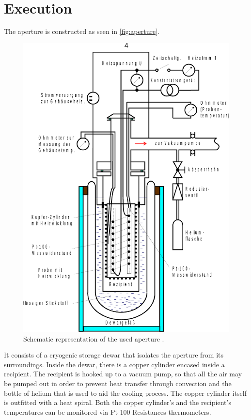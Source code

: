 \section{Execution}
\label{sec:Durchführung}

The aperture is constructed as seen in \autoref{fig:aperture}.

\begin{figure}[H]
    \centering
    \includegraphics[]{figures/apparature.pdf}
    \caption{Schematic representation of the used aperture \cite{v47}.}
    \label{fig:aperture}
\end{figure}

It consists of a cryogenic storage dewar that isolates the aperture from its surroundings. Inside the dewar, there is a copper cylinder encased inside a recipient.
The recipient is hooked up to a vacuum pump, so that all the air may be pumped out in order to prevent heat transfer through convection and the bottle of helium that is used to aid the cooling process.
The copper cylinder itself is outfitted with a heat spiral.
Both the copper cylinder's and the recipient's temperatures can be monitored via Pt-100-Resistances thermometers. \\

